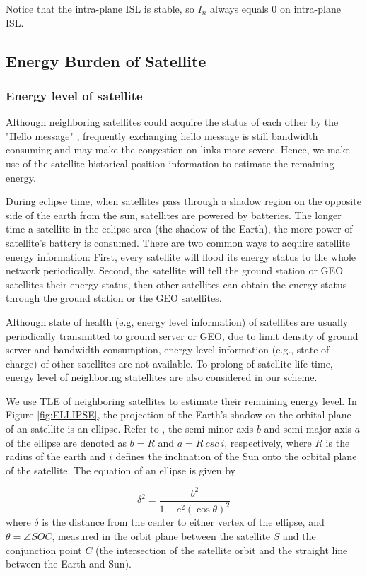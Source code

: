 Notice that the intra-plane ISL is stable, so $I_n$ always equals 0 on intra-plane ISL.

\subsection{Energy Burden of Satellite}
\subsubsection{Energy level of satellite}
Although neighboring satellites could acquire the status of each other by the "Hello message" \cite{OPSPF},  frequently exchanging hello message is still bandwidth consuming and  may make the congestion on links more severe. Hence, we make use of the satellite historical position information to estimate the remaining energy.

During eclipse time, when satellites pass through a shadow region on the opposite side of the earth from the sun, satellites are powered by batteries. The longer time a satellite in the eclipse area (the shadow of the Earth), the more power of satellite's battery is consumed. There are two common ways to acquire satellite energy information: First, every satellite will flood its energy status to the whole network periodically. Second, the satellite will tell the ground station or GEO satellites their energy status, then other satellites can obtain the energy status through the ground station or the GEO satellites. 

Although state of health (e.g, energy level information) of satellites are usually periodically transmitted to ground server or GEO, due to limit density of ground server and bandwidth consumption,  energy level information (e.g., state of charge) of other satellites are not available.  To prolong of satellite life time, energy level of neighboring statellites are also considered in our scheme. 

We use TLE of neighboring satellites to estimate their remaining energy level. 
In Figure \ref{fig:ELLIPSE}, the projection of the Earth’s shadow on the orbital plane of an satellite is an ellipse. Refer to \cite{ELLIPSE}, the semi-minor axis $b$ and semi-major axis $a$ of the ellipse are denoted as $b=R$ and $a=R\ csc\ i$, respectively, where $R$ is the radius of the earth and $i$ defines the inclination of the Sun onto the orbital plane of the satellite. The equation of an ellipse is given by 

\begin{equation}
 \delta^{2}=\frac{b^{2}}{1-e^{2}(\cos \theta)^{2}} 
 \label{eq:ELLIPSE}
\end{equation}
where $\delta$ is the distance from the center to either vertex of the ellipse, and $\theta = \angle SOC$, measured in the orbit plane between the satellite $S$ and the conjunction point $C$ (the intersection of the satellite orbit and the straight line between the Earth and Sun).

